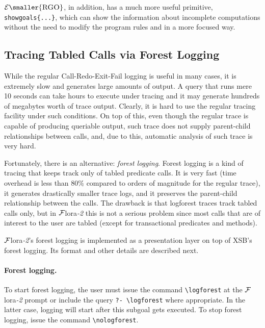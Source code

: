 \documentclass[11pt]{article}
\newcommand{\FLORA}{{\mbox{\sc ${\cal F}${lora}\rm\emph{-2}}}\xspace}
\newcommand{\ERGO}{\ensuremath{\cal{E}\mbox{\smaller{\sc{RGO}}}}\xspace}
\newcommand{\FLSYSTEM}{\FLORA}
\newcommand{\bs}{\textbackslash}
\begin{document}
\ERGO, in addition, has a much more useful primitive,
\texttt{showgoals\{...\}}, which can show the information about incomplete
computations without the need to modify the program rules and in a more
focused way.

\ifdef{\isfloraman}{}
{
  
  
}


\subsection{Tracing Tabled Calls via Forest Logging}\label{sec-logforest}

While the regular Call-Redo-Exit-Fail logging is useful in many cases, it
is extremely slow and generates large amounts of output. A query that
runs mere 10 seconds can take hours to execute under tracing and it may
generate hundreds of megabytes worth of trace output. Clearly, it is hard
to use the regular tracing facility under such conditions.
On top of this, even though the regular trace is capable of producing
queriable output, such trace does not supply parent-child 
relationships between calls, and, due to this, automatic analysis of
such trace is very hard.

Fortunately, there is an alternative: \emph{forest logging}.
Forest logging is a kind of tracing that keeps track only of tabled
predicate calls. It is very fast (time overhead is less than 80\% compared
to orders of magnitude for the regular trace), it generates
drastically smaller trace logs, and it preserves the parent-child
relationship between the calls. The drawback is that logforest
traces track tabled calls
only, but in \FLSYSTEM this is not a serious problem since most calls that
are of interest to the user are
tabled (except for transactional predicates and methods).

\FLSYSTEM's forest logging is 
implemented as a presentation layer on top of XSB's forest logging.
Its format and other details are described next.

\paragraph{Forest logging.}
To start forest logging, the user
must issue the command {\tt \bs{}logforest} at the \FLSYSTEM
prompt or include the query {\tt ?- \bs{}logforest} where appropriate.
In the latter case, logging will start after this subgoal gets executed. 
To stop forest logging, issue the command {\tt \bs{}nologforest}. 
\end{document}
